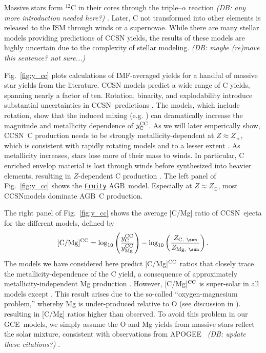 \documentclass[fleqn,
usenatbib]{mnras}
\makeatletter
\newcommand{\fruity}{\texttt{\hyperlink{fruity}{Fruity}}}
\newcommand{\agb}{AGB}
\newcommand{\apogee}{APOGEE}
\newcommand{\cc}{CCSN}
\newcommand{\gce}{GCE}
\newcommand{\Ycc}{{y_{\rm C}^{\rm CC}}}
\newcommand{\Yoc}{{y_{\rm Mg}^{\rm CC}}}
\newcommand{\Zo}{ Z_{\sun}}
\DeclareRobustCommand\citepos
  {\begingroup
   \let\NAT@nmfmt\NAT@posfmt%
   \NAT@swafalse\let\NAT@ctype\z@\NAT@partrue
   \@ifstar{\NAT@fulltrue\NAT@citetp}{\NAT@fullfalse\NAT@citetp}}
\let\NAT@orig@nmfmt\NAT@nmfmt
\def\NAT@posfmt#1{\NAT@orig@nmfmt{#1's}}
\newcommand{\dbnote}[1]{ {\color{Thistle} \textit{\small (DB: #1)}} }
\makeatother
\begin{document}
Massive stars form $^{12}$C in their cores through the triple--$\alpha$ reaction \dbnote{any more introduction needed here?}. Later, C not transformed into other elements is released to the ISM through winds or a supernovae.
While there are many stellar models providing predictions of \cc{} yields, the results of these models are highly uncertain due to the complexity of stellar modeling. \dbnote{maybe (re)move this sentence? not sure...}

Fig.~\ref{fig:y_cc} plots calculations of IMF-averaged yields for a handful of massive star yields from the literature.
\cc{} models predict a wide range of C yields, spanning nearly a factor of ten. 
Rotation, binarity, and explodability introduce substantial uncertainties in \cc\ predictions \citep{farmer+21}. The \cite{LC18} models, which include rotation, show that the induced mixing (e.g. \citealt{frischknecht+16}) can dramatically increase the magnitude and metallicity dependence of $\Ycc$. As we will later emperically show, \cc\ C production needs to be strongly metallicity-dependent at $Z \approx \Zo$, which is consistent with \citepos{LC18} rapidly rotating models and to a lesser extent \citet{NKT13}.
As metallicity increases, stars lose more of their mass to winds. In particular, C enriched envelop material is lost through winds before synthesized into heavier elements, resulting in $Z$-dependent C production \citep{LC18}.
The left panel of Fig.~\ref{fig:y_cc} shows the \fruity{} \agb\ model. Especially at $Z\approx Z_\odot$, most \cc models dominate \agb\ C production. 


The right panel of Fig.~\ref{fig:y_cc} shows the average [C/Mg] ratio of \cc\ ejecta for the different models, defined by
\begin{equation}\label{eq:c_mg_cc}
    {\rm [C/Mg]^{CC}} = \log_{10}\left( \frac{\Ycc}{\Yoc}\right) - \log_{10} \left( \frac{Z_{{\rm C},\ \sun }}{Z_{{\rm Mg},\ \sun }} \right).
\end{equation}
The models we have considered here predict [C/Mg]$^{\rm CC}$ ratios that closely trace the metallicity-dependence of the C yield, a consequence of approximately
metallicity-independent Mg production \citep[e.g][]{andrews+17}.
However, [C/Mg]$^{\rm CC}$ is super-solar in all models except
\citet{NKT13}.
This result arises due to the so-called ``oxygen-magnesium problem,'' whereby Mg
is under-produced relative to O (see discussion in \citealt{emily+21}).
resulting in [C/Mg] ratios higher than observed.
To avoid this problem in our \gce\ models, we simply assume the O and Mg yields
from massive stars reflect the solar mixture, consistent with observations from \apogee\ \citep{weinberg+19, weinberg+22} \dbnote{update these citations?}.
\end{document}
